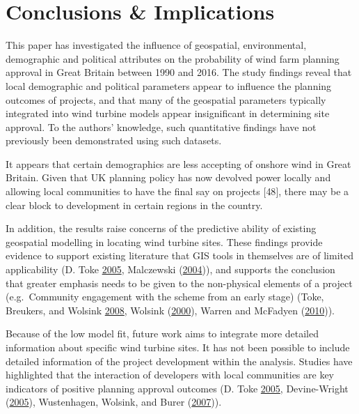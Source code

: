 \documentclass[a4paper,]{article}
\theoremstyle{definition}
\theoremstyle{definition}
\theoremstyle{remark}
\begin{document}
{\section{Conclusions \& Implications}\label{conclusions-implications}

This paper has investigated the influence of geospatial, environmental,
demographic and political attributes on the probability of wind farm
planning approval in Great Britain between 1990 and 2016. The study
findings reveal that local demographic and political parameters appear
to influence the planning outcomes of projects, and that many of the
geospatial parameters typically integrated into wind turbine models
appear insignificant in determining site approval. To the authors'
knowledge, such quantitative findings have not previously been
demonstrated using such datasets.

It appears that certain demographics are less accepting of onshore wind
in Great Britain. Given that UK planning policy has now devolved power
locally and allowing local communities to have the final say on projects
{[}48{]}, there may be a clear block to development in certain regions
in the country.

In addition, the results raise concerns of the predictive ability of
existing geospatial modelling in locating wind turbine sites. These
findings provide evidence to support existing literature that GIS tools
in themselves are of limited applicability (D. Toke
\protect\hyperlink{ref-Toke2005}{2005}, Malczewski
(\protect\hyperlink{ref-Malczewski2004}{2004})), and supports the
conclusion that greater emphasis needs to be given to the non-physical
elements of a project (e.g.~Community engagement with the scheme from an
early stage) (Toke, Breukers, and Wolsink
\protect\hyperlink{ref-Toke2008}{2008}, Wolsink
(\protect\hyperlink{ref-Wolsink2000}{2000}), Warren and McFadyen
(\protect\hyperlink{ref-Warren2010}{2010})).

Because of the low model fit, future work aims to integrate more
detailed information about specific wind turbine sites. It has not been
possible to include detailed information of the project development
within the analysis. Studies have highlighted that the interaction of
developers with local communities are key indicators of positive
planning approval outcomes (D. Toke
\protect\hyperlink{ref-Toke2005}{2005}, Devine-Wright
(\protect\hyperlink{ref-Devine-Wright2005a}{2005}), Wustenhagen,
Wolsink, and Burer (\protect\hyperlink{ref-Wustenhagen2007}{2007})).

}
\end{document}
